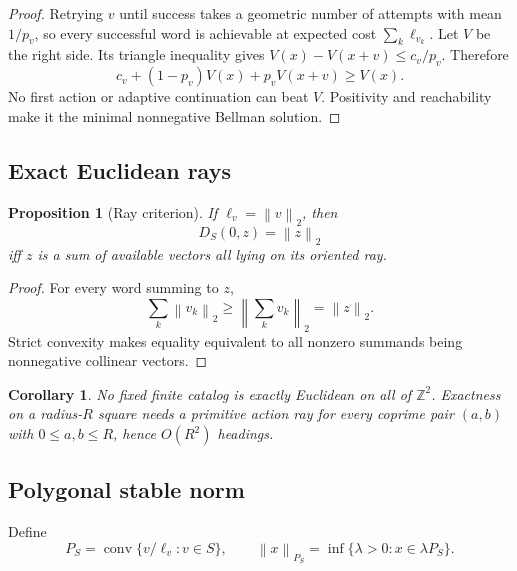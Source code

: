 \documentclass[11pt]{article}
\newtheorem{proposition}[theorem]{Proposition}
\newtheorem{corollary}[theorem]{Corollary}
\theoremstyle{definition}\newtheorem{definition}[theorem]{Definition}
\theoremstyle{remark}\newtheorem{remark}[theorem]{Remark}
\newcommand{\Z}{\mathbb Z}
\newcommand{\conv}{\operatorname{conv}}
\newcommand{\norm}[1]{\left\lVert #1\right\rVert}
\begin{document}
\begin{proof}
Retrying \(v\) until success takes a geometric number of attempts with mean
\(1/p_v\), so every successful word is achievable at expected cost
\(\sum_k\ell_{v_k}\). Let \(V\) be the right side. Its triangle inequality
gives \(V(x)-V(x+v)\le c_v/p_v\). Therefore
\[
c_v+(1-p_v)V(x)+p_vV(x+v)\ge V(x).
\]
No first action or adaptive continuation can beat \(V\). Positivity and
reachability make it the minimal nonnegative Bellman solution.
\end{proof}

\subsection{Exact Euclidean rays}

\begin{proposition}[Ray criterion]
\label{prop:ray}
If \(\ell_v=\norm v_2\), then
\[
D_S(0,z)=\norm z_2
\]
iff \(z\) is a sum of available vectors all lying on its oriented ray.
\end{proposition}
\begin{proof}
For every word summing to \(z\),
\[
\sum_k\norm{v_k}_2\ge\norm{\sum_kv_k}_2=\norm z_2.
\]
Strict convexity makes equality equivalent to all nonzero summands being
nonnegative collinear vectors.
\end{proof}

\begin{corollary}
No fixed finite catalog is exactly Euclidean on all of \(\Z^2\). Exactness on
a radius-\(R\) square needs a primitive action ray for every coprime pair
\((a,b)\) with \(0\le a,b\le R\), hence \(O(R^2)\) headings.
\end{corollary}

\subsection{Polygonal stable norm}

Define
\begin{equation}
P_S=\conv\{v/\ell_v:v\in S\},\qquad
\norm x_{P_S}=\inf\{\lambda>0:x\in\lambda P_S\}.
\label{eq:gauge}
\end{equation}
\end{document}
